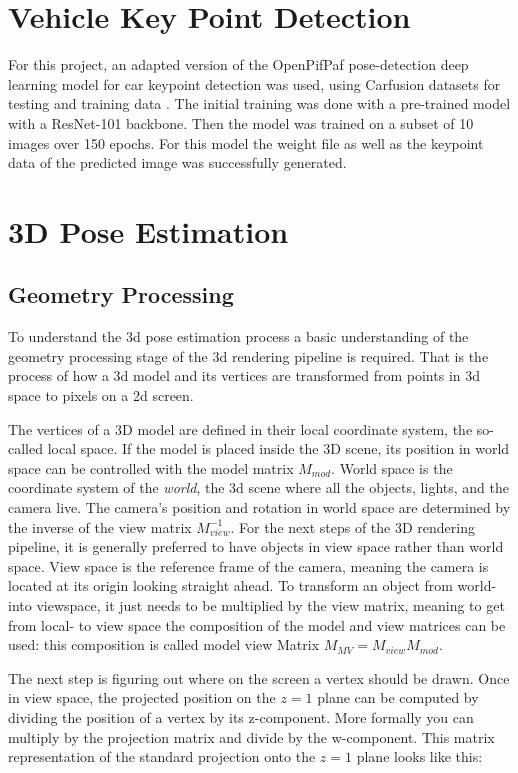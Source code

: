 \documentclass[conference]{IEEEtran}
\begin{document}
\section{Vehicle Key Point Detection}

For this project, an adapted version of the OpenPifPaf pose-detection deep learning model for car keypoint detection was used, using Carfusion datasets for testing and training data \cite{Carfusion}. The initial training was done with a pre-trained model with a ResNet-101 backbone. Then the model was trained on a subset of 10 images over 150 epochs. For this model the weight file as well as the keypoint data of the predicted image was successfully generated. 

\section{3D Pose Estimation}

\subsection{Geometry Processing}

To understand the 3d pose estimation process a basic understanding of the geometry processing stage of the 3d rendering pipeline is required. That is the process of how a 3d model and its vertices are transformed from points in 3d space to pixels on a 2d screen.

The vertices of a 3D model are defined in their local coordinate system, the so-called local space. If the model is placed inside the 3D scene, its position in world space can be controlled with the model matrix $M_{mod}$. World space is the coordinate system of the \textit{world}, the 3d scene where all the objects, lights, and the camera live. The camera's position and rotation in world space are determined by the inverse of the view matrix $M_{view}^{-1}$. For the next steps of the 3D rendering pipeline, it is generally preferred to have objects in view space rather than world space. View space is the reference frame of the camera, meaning the camera is located at its origin looking straight ahead. To transform an object from world- into viewspace, it just needs to be multiplied by the view matrix, meaning to get from local- to view space the composition of the model and view matrices can be used: this composition is called model view Matrix $M_{MV}=M_{view}M_{mod}$.

The next step is figuring out where on the screen a vertex should be drawn. Once in view space, the projected position on the $z = 1$ plane can be computed by dividing the position of a vertex by its z-component. More formally you can multiply by the projection matrix and divide by the w-component. This matrix representation of the standard projection onto the $z = 1$ plane looks like this:
\end{document}
